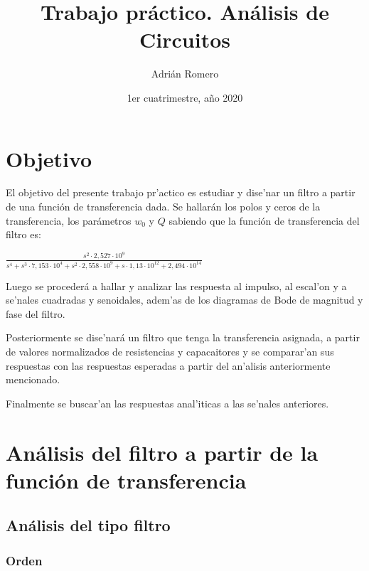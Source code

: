 \documentclass[12pt, titlepage]{article}
\begin{document}
\title{Trabajo práctico. Análisis de Circuitos}
\author{Adrián Romero}
\date{1er cuatrimestre, año 2020}
\maketitle

\tableofcontents


\maketitle

\newpage
\section{Objetivo}

El objetivo del presente trabajo pr'actico es estudiar y dise'nar un filtro a partir de una función de transferencia dada. Se hallarán los polos y ceros de la transferencia, los parámetros $w_0$ y $Q$ sabiendo que la función de transferencia del filtro es: 

\begin{center}
    $
    \frac{s^2 \cdot 2,527 \cdot 10^9}
    {s^4 + s^3 \cdot 7,153 \cdot 10^4 + 
     s^2 \cdot 2,558 \cdot 10^9  +
     s \cdot 1,13\cdot 10^{12} +
     2,494 \cdot 10^{14} }
$
\end{center}

Luego se procederá a hallar y analizar las respuesta al impulso, al escal'on y a se'nales cuadradas y senoidales, adem'as de los diagramas de Bode de magnitud y fase del filtro.

Posteriormente se dise'nará un filtro que tenga la transferencia asignada, a partir de valores normalizados de resistencias y capacaitores y se comparar'an sus respuestas con las respuestas esperadas a partir del an'alisis anteriormente mencionado.

Finalmente se buscar'an las respuestas anal'iticas a las se'nales anteriores.

\section{Análisis del filtro a partir de la función de transferencia}
    \subsection{Análisis del tipo filtro}
    \subsubsection{Orden}
    
\end{document}
